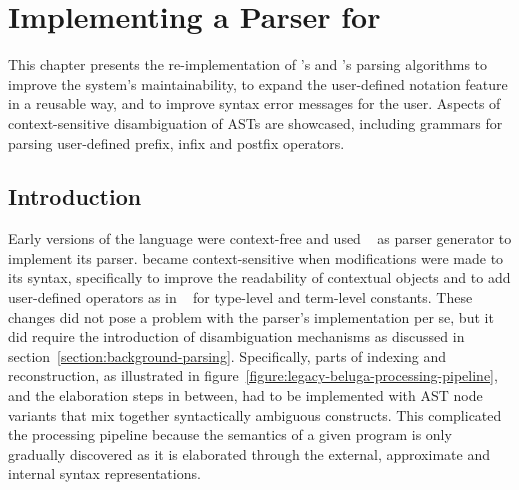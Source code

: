 \chapter{Implementing a Parser for \Beluga}\label{chapter:parsing-reimplementation}

This chapter presents the re-implementation of \Beluga's and \Harpoon's parsing algorithms to improve the system's maintainability, to expand the user-defined notation feature in a reusable way, and to improve syntax error messages for the user.
Aspects of context-sensitive disambiguation of \acp{AST} are showcased, including grammars for parsing user-defined prefix, infix and postfix operators.

\section{Introduction}\label{section:parser-introduction}

Early versions of the \Beluga language were context-free and used \CamlpFour~\cite{de2003camlp4} as parser generator to implement its parser.
\Beluga became context-sensitive when modifications were made to its syntax, specifically to improve the readability of contextual objects and to add user-defined operators as in \Twelf~\cite{Twelf} for \LF type-level and term-level constants.
These changes did not pose a problem with the parser's implementation per se, but it did require the introduction of disambiguation mechanisms as discussed in section~\ref{section:background-parsing}.
Specifically, parts of indexing and reconstruction, as illustrated in figure~\ref{figure:legacy-beluga-processing-pipeline}, and the elaboration steps in between, had to be implemented with \ac{AST} node variants that mix together syntactically ambiguous constructs.
This complicated the processing pipeline because the semantics of a given \Beluga program is only gradually discovered as it is elaborated through the external, approximate and internal syntax representations.


